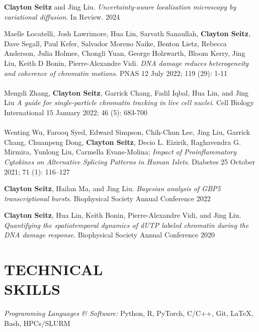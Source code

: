 \documentclass[margin, 10pt]{res} %
\begin{document}
\begin{resume}
\textbf{Clayton Seitz} and Jing Liu. \textit{Uncertainty-aware localization microscopy by variational diffusion}. In Review. 2024

Maelle Locatelli\textsuperscript{\textdagger}, Josh Lawrimore\textsuperscript{\textdagger}, Hua Lin\textsuperscript{\textdagger}, Sarvath Sanaullah, \textbf{Clayton Seitz}, Dave Segall, Paul Kefer, Salvador Moreno Naike, Benton Lietz, Rebecca Anderson, Julia Holmes, Chongli Yuan, George Holzwarth, Bloom Kerry, Jing Liu, Keith D Bonin, Pierre-Alexandre Vidi. \textit{DNA damage reduces heterogeneity and coherence of chromatin motions}. PNAS 12 July 2022; 119 (29): 1-11
\\
\\
Mengdi Zhang, \textbf{Clayton Seitz}, Garrick Chang, Fadil Iqbal, Hua Lin, and Jing Liu \textit{A guide for single-particle chromatin tracking in live cell nuclei}. Cell Biology International 15 January 2022; 46 (5): 683-700
\\
\\
Wenting Wu, Farooq Syed, Edward Simpson, Chih-Chun Lee, Jing Liu, Garrick Chang, Chuanpeng Dong, \textbf{Clayton Seitz}, Decio L. Eizirik, Raghavendra G. Mirmira, Yunlong Liu, Carmella Evans-Molina; \textit{Impact of Proinflammatory Cytokines on Alternative Splicing Patterns in Human Islets}. Diabetes 25 October 2021; 71 (1): 116–127

\textbf{Clayton Seitz}, Hailan Ma, and Jing Liu. \textit{Bayesian analysis of GBP5 transcriptional bursts}. Biophysical Society Annual Conference 2022


\textbf{Clayton Seitz}, Hua Lin, Keith Bonin, Pierre-Alexandre Vidi, and Jing Liu. \textit{Quantifying the spatiotemporal dynamics of dUTP labeled chromatin during the DNA damage response}. Biophysical Society Annual Conference 2020


\section{TECHNICAL \\ SKILLS} 

{\sl Programming Languages \& Software:} 
Python, R, PyTorch, C/C++, Git, LaTeX, Bash, HPCs/SLURM\\

\end{resume}
\end{document}
